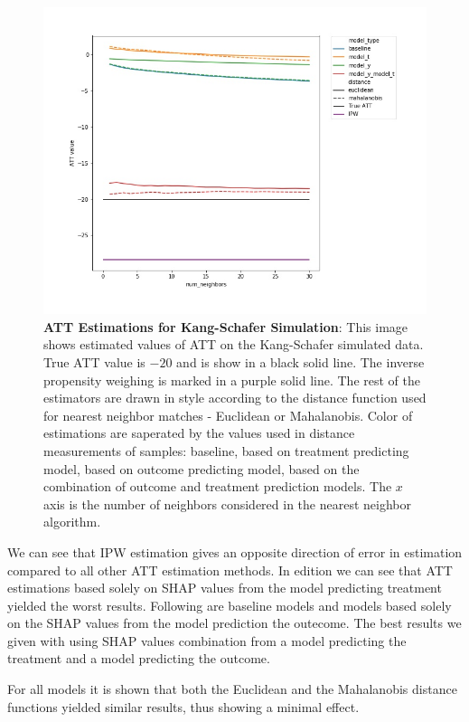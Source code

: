 \documentclass{article}
\begin{document}
\begin{figure}
    \centering
    \includegraphics[width=\textwidth]{Paper/images/kang_schafer_ATE_estimations_by_neighbor.jpg}
    \caption{\textbf{ATT Estimations for Kang-Schafer Simulation}: This image shows estimated values of ATT on the Kang-Schafer simulated data. True ATT value is $-20$ and is show in a black solid line. The inverse propensity weighing is marked in a purple solid line. The rest of the estimators are drawn in style according to the distance function used for nearest neighbor matches - Euclidean or Mahalanobis. Color of estimations are saperated by the values used in distance measurements of samples: baseline, based on treatment predicting model, based on outcome predicting model, based on the combination of outcome and treatment prediction models. The $x$ axis is the number of neighbors considered in the nearest neighbor algorithm.}
    \label{fig:kang_schafer}
\end{figure}

We can see that IPW estimation gives an opposite direction of error in estimation compared to all other ATT estimation methods. In edition we can see that ATT estimations based solely on SHAP values from the model predicting treatment yielded the worst results. Following are baseline models and models based solely on the SHAP values from the model prediction the outecome. The best results we given with using SHAP values combination from a model predicting the treatment and a model predicting the outcome. 

For all models it is shown that both the Euclidean and the Mahalanobis distance functions yielded similar results, thus showing a minimal effect. 
\end{document}
